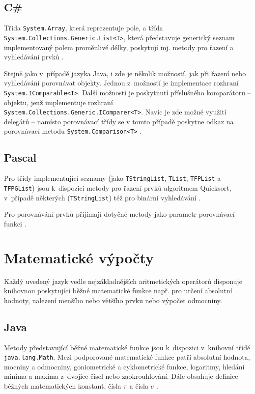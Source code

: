 \documentclass[onepage, a4paper, 12pt]{bakalarka}
\begin{document}
\subsection{C\#}
Třída \texttt{System.Array}, která reprezentuje pole, a třída \texttt{System.Collections\-.Generic.List<T>}, která představuje generický seznam implementovaný polem proměnlivé délky, poskytují mj. metody pro řazení a vyhledávání prvků \cite{cs-guide-array, cs-guide-list}.\par
Stejně jako v~případě jazyka Java, i zde je několik možností, jak při řazení nebo vyhledávání porovnávat objekty. Jednou z~možností je implementace rozhraní \texttt{System.IComparable<T>}. Další možností je poskytnutí příslušného komparátoru -- objektu, jenž implementuje rozhraní \texttt{System.Collections\-.Generic.IComparer<T>}. Navíc je zde možné využití delegátů  --  namísto porovnávací třídy se v tomto případě poskytne odkaz na porovnávací metodu \texttt{System.Comparison<T>} \cite{cs-guide-icomparable, cs-guide-icomparer, cs-guide-comparison}.

\subsection{Pascal}
Pro třídy implementující seznamy (jako \texttt{TStringList}, \texttt{TList}, \texttt{TFPList} a \texttt{TFPGList}) jsou k~dispozici metody pro řazení prvků algoritmem Quicksort, v~případě některých (\texttt{TStringList}) též pro binární vyhledávání \cite{pas-guide-tlistsort, pas-guide-tfplistsort}.\par
Pro porovnávání prvků přijímají dotyčné metody jako parametr porovnávací funkci \cite{pas-guide-tlistsortcompare}.

\section{Matematické výpočty}
Každý uvedený jazyk vedle nejzákladnějších aritmetických operátorů disponuje knihovnou poskytující běžné matematické funkce např. pro určení absolutní hodnoty, nalezení menšího nebo většího prvku nebo výpočet odmocniny.

\subsection{Java}
Metody představující běžné matematické funkce jsou k~dispozici v~knihovní třídě \texttt{java.lang.Math}. Mezi podporované matematické funkce patří absolutní hodnota, mocniny a odmocniny, goniometrické a cyklometrické funkce, logaritmy, hledání minima a maxima z~dvojice čísel nebo zaokrouhlování. Dále obsahuje definice běžných matematických konstant, čísla $\pi$ a čísla $e$ \cite{java-guide-math}.
\end{document}

